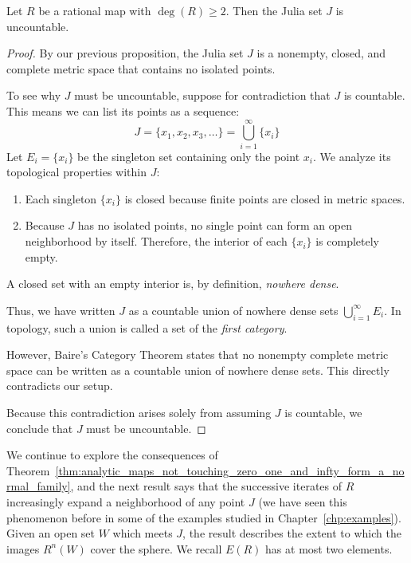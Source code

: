 \begin{theorem}[$J$ is uncountable]
    \label{thm:J_is_uncountable}
    Let $R$ be a rational map with $\deg(R) \geq 2$. Then the Julia set $J$ is
    uncountable.
\end{theorem}
\begin{proof}
    By our previous proposition, the Julia set $J$ is a nonempty, closed, and
    complete metric space that contains no isolated points. 
    
    To see why $J$ must be uncountable, suppose for contradiction that $J$ is
    countable. This means we can list its points as a sequence:
    \begin{equation*}
    J = \{x_1, x_2, x_3, \dots\} = \bigcup_{i=1}^{\infty} \{x_i\}
    \end{equation*}
    Let $E_i = \{x_i\}$ be the singleton set containing only the point $x_i$. We
    analyze its topological properties within $J$:
    \begin{enumerate}[label=(\roman*)]
        \item Each singleton $\{x_i\}$ is closed because finite points are
        closed in metric spaces.
        \item Because $J$ has no isolated points, no single point can form an
        open neighborhood by itself. Therefore, the interior of each $\{x_i\}$
        is completely empty.
    \end{enumerate}
    A closed set with an empty interior is, by definition, \emph{nowhere dense}. 
    
    Thus, we have written $J$ as a countable union of nowhere dense sets
    $\bigcup_{i=1}^{\infty} E_i$. In topology, such a union is called a set of
    the \emph{first category}. 
    
    However, Baire's Category Theorem states that no nonempty complete metric
    space can be written as a countable union of nowhere dense sets. This
    directly contradicts our setup. 
    
    Because this contradiction arises solely from assuming $J$ is countable, we
    conclude that $J$ must be uncountable.
\end{proof}

We continue to explore the consequences of
Theorem~\ref{thm:analytic_maps_not_touching_zero_one_and_infty_form_a_normal_family},
and the next result says that the successive iterates of $R$ increasingly expand
a neighborhood of any point $J$ (we have seen this phenomenon before in some of
the examples studied in Chapter~\ref{chp:examples}). Given an open set $W$ which
meets $J$, the result describes the extent to which the images $R^n(W)$ cover
the sphere. We recall $E(R)$ has at most two elements.

